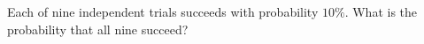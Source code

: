 Each of nine independent trials succeeds with probability $10\%$. What is the probability that all nine succeed?
